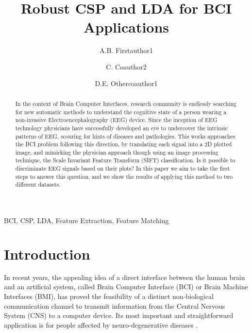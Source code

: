 \documentclass[nouppercase]{ifmbe}
\title{Robust CSP and LDA for BCI Applications}
\affiliation{Institution/Department, Affiliation, City, Country}{FIRSTAFF}
\author{A.B. Firstauthor1}{FIRSTAFF}
\author{C. Coauthor2}{FIRSTAFF}
\author{D.E. Othercoauthor1}{FIRSTAFF}
\begin{document}
\maketitle

\begin{abstract}
In the context of Brain Computer Interfaces, research community is endlessly searching for new automatic methods to understand the cognitive state of a person wearing a non-invasive Electroencephalography (EEG) device.  Since the inception of EEG technology physicians have successfully developed an eye to undercover the intrinsic patterns of EEG, scouring for hints of diseases and pathologies.  This works approaches the BCI problem following this direction, by translating each signal into a 2D plotted image, and mimicking the physician approach though using an image processing technique, the Scale Invariant Feature Transform (SIFT) classification. Is it possible to discriminate EEG signals based on their plots? In this paper we aim to take the first steps to answer this question, and we show the results of applying this method to two different datasets.


\end{abstract}

\begin{keywords}
BCI, CSP, LDA, Feature Extraction, Feature Matching
\end{keywords}

\section{Introduction}


In recent years, the appealing idea of a direct interface between the human brain and an artificial system, called Brain Computer Interface (BCI) or Brain Machine Interfaces (BMI), has proved the feasibility of a distinct non-biological communication channel to transmit information from the Central Nervous System (CNS) to a computer device.  Its most important and straightforward application is for people affected by neuro-degenerative diseases \cite{c6}. 

\end{document}
